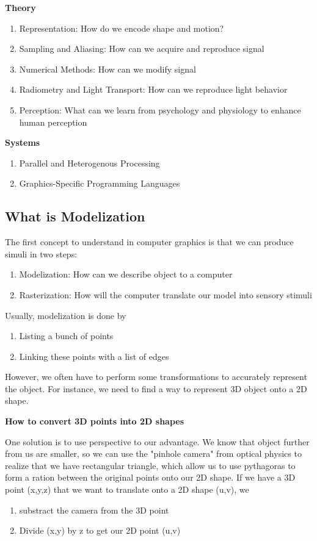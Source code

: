 \documentclass{article}
\begin{document}
\textbf{Theory}

\begin{enumerate}
    \item Representation: How do we encode shape and motion?
    \item Sampling and Aliasing: How can we acquire and reproduce signal
    \item Numerical Methods: How can we modify signal
    \item Radiometry and Light Transport: How can we reproduce light
	behavior
    \item Perception: What can we learn from psychology and physiology
	to enhance human perception
\end{enumerate}

\textbf{Systems}

\begin{enumerate}
    \item Parallel and Heterogenous Processing
    \item Graphics-Specific Programming Languages
\end{enumerate}

\subsection{What is Modelization}

The first concept to understand in computer graphics is that we can
produce simuli in two steps:
\begin{enumerate}
    \item Modelization: How can we describe object to a computer
    \item Rasterization: How will the computer translate our model into
	sensory stimuli
\end{enumerate}

Usually, modelization is done by
\begin{enumerate}
    \item Listing a bunch of points
    \item Linking these points with a list of edges
\end{enumerate}

However, we often have to perform some transformations to accurately
represent the object. For instance, we need to find a way to represent
3D object onto a 2D shape.

\textbf{How to convert 3D points into 2D shapes}

One solution is to use perspective to our advantage. We know that object
further from us are smaller, so we can use the "pinhole camera" from
optical physics to realize that we have rectangular triangle, which
allow us to use pythagoras to form a ration between the original points
onto our 2D shape. If we have a 3D point (x,y,z) that we want to translate
onto a 2D shape (u,v), we
\begin{enumerate}
    \item substract the camera from the 3D point
    \item Divide (x,y) by z to get our 2D point (u,v)
\end{enumerate}
\end{document}
